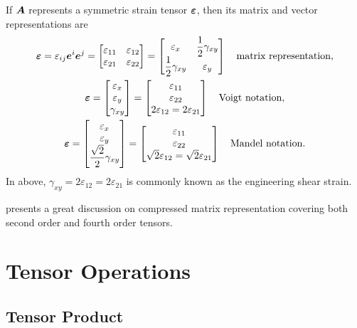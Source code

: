 If $\bm{A}$ represents a symmetric strain tensor $\bm{\varepsilon}$, then its matrix and vector representations are
\begin{gather}
\bm{\varepsilon}=\varepsilon_{ij}\bm{e}^i\bm{e}^j=\begin{bmatrix}
\varepsilon_{11}&\varepsilon_{12}\\
\varepsilon_{21}&\varepsilon_{22}
\end{bmatrix}=\begin{bmatrix}
\varepsilon_x&\dfrac{1}{2}\gamma_{xy}\\
\dfrac{1}{2}\gamma_{xy}&\varepsilon_y
\end{bmatrix}\quad\text{matrix representation},\\
\bm{\varepsilon}=\begin{bmatrix}
\varepsilon_x\\\varepsilon_y\\\gamma_{xy}
\end{bmatrix}=\begin{bmatrix}
\varepsilon_{11}\\\varepsilon_{22}\\2\varepsilon_{12}=2\varepsilon_{21}
\end{bmatrix}\quad\text{Voigt notation},\\
\bm{\varepsilon}=\begin{bmatrix}
\varepsilon_x\\\varepsilon_y\\\dfrac{\sqrt{2}}{2}\gamma_{xy}
\end{bmatrix}=\begin{bmatrix}
\varepsilon_{11}\\\varepsilon_{22}\\\sqrt{2}\varepsilon_{12}=\sqrt{2}\varepsilon_{21}
\end{bmatrix}\quad\text{Mandel notation}.
\end{gather}
In above, $\gamma_{xy}=2\varepsilon_{12}=2\varepsilon_{21}$ is commonly known as the engineering shear strain.

\cite{Helnwein2001} presents a great discussion on compressed matrix representation covering both second order and fourth order tensors.
\section{Tensor Operations}
\subsection{Tensor Product}
